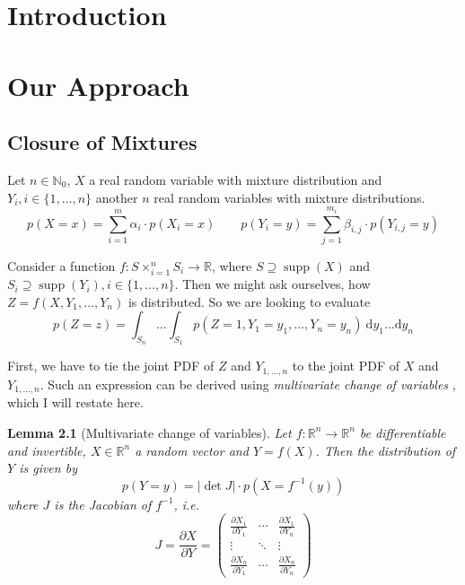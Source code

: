 \documentclass[11pt,a4paper]{book}
\newtheorem{lemma}{Lemma}
\DeclareMathOperator{\supp}{supp}
\begin{document}
\tableofcontents

\cleardoublepage

\mainmatter
\pagestyle{fancy}

\chapter{Introduction}

\chapter{Our Approach}

\section{Closure of Mixtures}

Let $n \in \mathbb{N}_{0}$, $X$ a real random variable with mixture distribution
and $Y_{i}, i \in \{ 1, \dots, n \}$ another $n$ real random variables with
mixture distributions.
\begin{equation*}
  p(X = x) = \sum_{i = 1}^{m} \alpha_{i} \cdot p(X_{i} = x) \qquad p(Y_{i} = y) = \sum_{j = 1}^{m_{i}} \beta_{i,j} \cdot p(Y_{i,j} = y)
\end{equation*}

Consider a function $f : S \times_{i = 1}^{n} S_{i} \rightarrow \mathbb{R}$,
where $S \supseteq \supp(X)$ and
$S_{i} \supseteq \supp(Y_{i}), i \in \{ 1, \dots, n \}$. Then we might ask
ourselves, how $Z = f(X, Y_{1}, \dots, Y_{n})$ is distributed. So we are looking
to evaluate
\begin{equation*}
  p(Z = z) = \int_{S_{n}}\dots\int_{S_{1}} p(Z = 1, Y_{1} = y_{1}, \dots, Y_{n} = y_{n})~\mathrm{d}y_{1}\dots\mathrm{d}y_{n}
\end{equation*}

First, we have to tie the joint PDF of $Z$ and $Y_{1, \dots, n}$ to the joint
PDF of $X$ and $Y_{1, \dots, n}$. Such an expression can be derived using
\emph{multivariate change of variables} \cite[chapter~2.6.2.1]{murphy}, which I
will restate here.

\begin{lemma}[Multivariate change of variables]
  \label{lemma:multivariate-change}
  Let $f : \mathbb{R}^{n} \rightarrow \mathbb{R}^{n}$ be differentiable and
  invertible, $X \in \mathbb{R}^{n}$ a random vector and $Y = f(X)$. Then the
  distribution of $Y$ is given by
  \begin{equation*}
    p(Y = y) = \left| \det J \right| \cdot p(X = f^{-1}(y))
  \end{equation*}
  where $J$ is the Jacobian of $f^{-1}$, i.e.
  \begin{equation*}
    J = \frac{\partial X}{\partial Y} = \begin{pmatrix}
      \frac{\partial X_{1}}{\partial Y_{1}} & \cdots & \frac{\partial X_{1}}{\partial Y_{n}}\\
      \vdots & \ddots & \vdots\\
      \frac{\partial X_{n}}{\partial Y_{1}} & \cdots & \frac{\partial X_{n}}{\partial Y_{n}}
    \end{pmatrix}
  \end{equation*}
\end{lemma}
\end{document}
